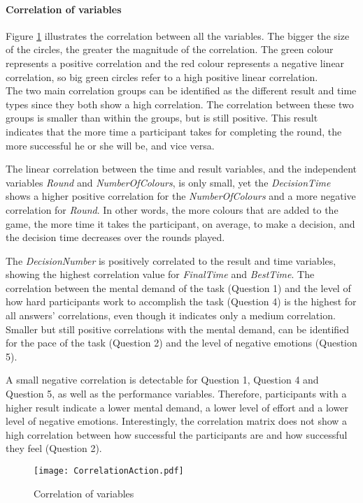 \paragraph{Correlation of variables}
Figure \ref{Correlation} illustrates the correlation between all the variables. The bigger the size of the circles, the greater the magnitude of the correlation. The green colour represents a positive correlation and the red colour represents a negative linear correlation, so big green circles refer to a high positive linear correlation.\\
The two main correlation groups can be identified as the different result and time types since they both show a high correlation. The correlation between these two groups is smaller than within the groups, but is still positive. This result indicates that the more time a participant takes for completing the round, the more successful he or she will be, and vice versa.

The linear correlation between the time and result variables, and the independent variables \textit{Round} and \textit{NumberOfColours}, is only small, yet the \textit{DecisionTime} shows a higher positive correlation for the \textit{NumberOfColours} and a more negative correlation for \textit{Round}. In other words, the more colours that are added to the game, the more time it takes the participant, on average, to make a decision, and the decision time decreases over the rounds played.

The \textit{DecisionNumber} is positively correlated to the result and time variables, showing the highest correlation value for \textit{FinalTime} and \textit{BestTime}. The correlation between the mental demand of the task (Question 1) and the level of how hard participants work to accomplish the task (Question 4) is the highest for all answers' correlations, even though it indicates only a medium correlation. Smaller but still positive correlations with the mental demand, can be identified for the pace of the task (Question 2) and the level of negative emotions (Question 5).

A small negative correlation is detectable for Question 1, Question 4 and Question 5, as well as the performance variables. Therefore, participants with a higher result indicate a lower mental demand, a lower level of effort and a lower level of negative emotions. Interestingly, the correlation matrix does not show a high correlation between how successful the participants are and how successful they feel (Question 2). 
 \begin{figure}[h] %
\begin{center} %
  \texttt{[image: CorrelationAction.pdf]}
  \caption{Correlation of variables}
  \label{Correlation}
\end{center}
\end{figure}
